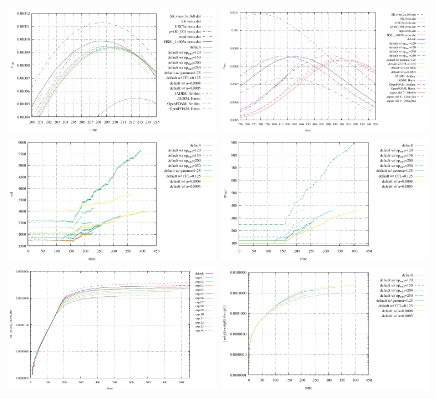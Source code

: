 \begin{center}
\includegraphics[width=5.5cm]{python_codes/fieldstone_95/results/vrms_peak1}
\includegraphics[width=5.5cm]{python_codes/fieldstone_95/results/vrms_peak2}\\
\includegraphics[width=5.5cm]{python_codes/fieldstone_95/results/nel}
\includegraphics[width=5.5cm]{python_codes/fieldstone_95/results/np_surf}\\
\includegraphics[width=5.5cm]{python_codes/fieldstone_95/results/vol1}
\includegraphics[width=5.5cm]{python_codes/fieldstone_95/results/vol2}

\end{center}
